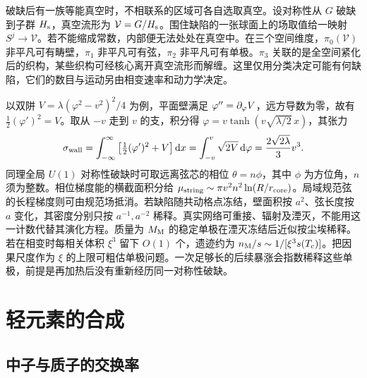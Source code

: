 破缺后有一族等能真空时，不相联系的区域可各自选取真空。设对称性从 $G$ 破缺到子群 $H_{\rm s}$，真空流形为 $\mathcal V=G/H_{\rm s}$。围住缺陷的一张球面上的场取值给一映射 $S^j\to\mathcal V$。若不能缩成常数，内部便无法处处在真空中。在三个空间维度，$\pi_0(\mathcal V)$ 非平凡可有畴壁，$\pi_1$ 非平凡可有弦，$\pi_2$ 非平凡可有单极。$\pi_3$ 关联的是全空间紧化后的织构，某些织构可经核心离开真空流形而解缠。这里仅用分类决定可能有何缺陷，它们的数目与运动另由相变速率和动力学决定。

以双阱 $V=\lambda(\varphi^2-v^2)^2/4$ 为例，平面壁满足 $\varphi''=\partial_\varphi V$，远方导数为零，故有 $\tfrac12(\varphi')^2=V$。取从 $-v$ 走到 $v$ 的支，积分得 $\varphi=v\tanh(v\sqrt{\lambda/2}\,x)$，其张力
\[
 \sigma_{\rm wall}=\int_{-\infty}^\infty
 \left[\tfrac12(\varphi')^2+V\right]\dd x
 =\int_{-v}^{v}\sqrt{2V}\,\dd\varphi=\frac{2\sqrt{2\lambda}}{3}v^3 .
\]
同理全局 $U(1)$ 对称性破缺时可取远离弦芯的相位 $\theta=n\phi$，其中 $\phi$ 为方位角，$n$ 须为整数。相位梯度能的横截面积分给 $\mu_{\rm string}\sim\pi v^2 n^2\ln(R/r_{\rm core})$。局域规范弦的长程梯度则可由规范场抵消。若缺陷随共动格点冻结，壁面积按 $a^2$、弦长度按 $a$ 变化，其密度分别只按 $a^{-1},a^{-2}$ 稀释。真实网络可重接、辐射及湮灭，不能用这一计数代替其演化方程。质量为 $M_{\rm M}$ 的稳定单极在湮灭冻结后近似按尘埃稀释。若在相变时每相关体积 $\xi^3$ 留下 $O(1)$ 个，遗迹约为 $n_{\rm M}/s\sim1/[\xi^3s(T_c)]$。把因果尺度作为 $\xi$ 的上限可粗估单极问题。一次足够长的后续暴涨会指数稀释这些单极，前提是再加热后没有重新经历同一对称性破缺。

\section{轻元素的合成}\label{sec:cosmo-nuclear-network}

\subsection{中子与质子的交换率}

